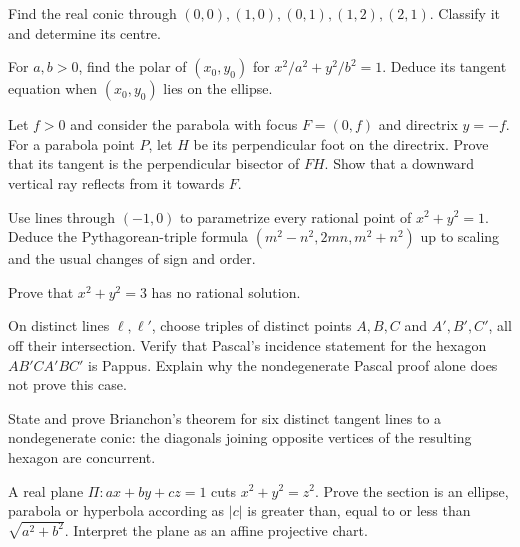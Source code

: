 \begin{exercise}[$\star$]\label{geometry:ex:fivepoints}
Find the real conic through $(0,0),(1,0),(0,1),(1,2),(2,1)$. Classify it and determine its centre.
\end{exercise}
\begin{exercise}[$\star$]\label{geometry:ex:tangentellipse}
For $a,b>0$, find the polar of $(x_0,y_0)$ for $x^2/a^2+y^2/b^2=1$. Deduce its tangent equation when $(x_0,y_0)$ lies on the ellipse.
\end{exercise}
\begin{exercise}[$\star$]\label{geometry:ex:parabolareflect}
Let $f>0$ and consider the parabola with focus $F=(0,f)$ and directrix $y=-f$. For a parabola point $P$, let $H$ be its perpendicular foot on the directrix. Prove that its tangent is the perpendicular bisector of $FH$. Show that a downward vertical ray reflects from it towards $F$.
\end{exercise}
\begin{exercise}[$\star$]\label{geometry:ex:pythagorean}
Use lines through $(-1,0)$ to parametrize every rational point of $x^2+y^2=1$. Deduce the Pythagorean-triple formula $(m^2-n^2,2mn,m^2+n^2)$ up to scaling and the usual changes of sign and order.
\end{exercise}
\begin{exercise}[$\star$]\label{geometry:ex:nothree}
Prove that $x^2+y^2=3$ has no rational solution.
\end{exercise}
\begin{exercise}[$\star$]\label{geometry:ex:pascalpappus}
On distinct lines $\ell,\ell'$, choose triples of distinct points $A,B,C$ and $A',B',C'$, all off their intersection. Verify that Pascal's incidence statement for the hexagon $AB'CA'BC'$ is Pappus. Explain why the nondegenerate Pascal proof alone does not prove this case.
\end{exercise}
\begin{exercise}[$\star$]\label{geometry:ex:brianchon}
State and prove Brianchon's theorem for six distinct tangent lines to a nondegenerate conic: the diagonals joining opposite vertices of the resulting hexagon are concurrent.
\end{exercise}
\begin{exercise}[$\star\star$]\label{geometry:ex:conesection}
A real plane $\Pi:ax+by+cz=1$ cuts $x^2+y^2=z^2$. Prove the section is an ellipse, parabola or hyperbola according as $|c|$ is greater than, equal to or less than $\sqrt{a^2+b^2}$. Interpret the plane as an affine projective chart.
\end{exercise}
